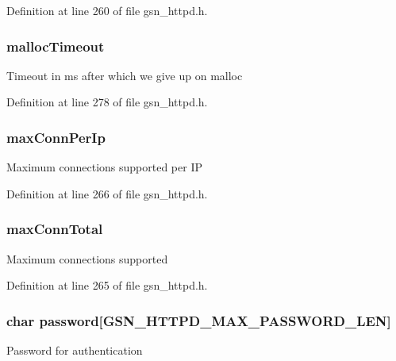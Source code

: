 Definition at line 260 of file gsn\_\-httpd.h.

\hypertarget{a00095_a9f7ab5e13d82c9b5312c3c3e3dd1dd19}{
\subsubsection[{mallocTimeout}]{ {\bf mallocTimeout}}}
\label{a00095_a9f7ab5e13d82c9b5312c3c3e3dd1dd19}
Timeout in ms after which we give up on malloc 

Definition at line 278 of file gsn\_\-httpd.h.

\hypertarget{a00095_a30eac69b4161acf08ca8f59846875220}{
\subsubsection[{maxConnPerIp}]{ {\bf maxConnPerIp}}}
\label{a00095_a30eac69b4161acf08ca8f59846875220}
Maximum connections supported per IP 

Definition at line 266 of file gsn\_\-httpd.h.

\hypertarget{a00095_a0882f2e0f23795ba45a974d3f8eae786}{
\subsubsection[{maxConnTotal}]{ {\bf maxConnTotal}}}
\label{a00095_a0882f2e0f23795ba45a974d3f8eae786}
Maximum connections supported 

Definition at line 265 of file gsn\_\-httpd.h.

\hypertarget{a00095_ae8e911decf3e8573145b7626e623270e}{
\subsubsection[{password}]{\setlength{\rightskip}{0pt plus 5cm}char {\bf password}\mbox{[}GSN\_\-HTTPD\_\-MAX\_\-PASSWORD\_\-LEN\mbox{]}}}
\label{a00095_ae8e911decf3e8573145b7626e623270e}
Password for authentication 

